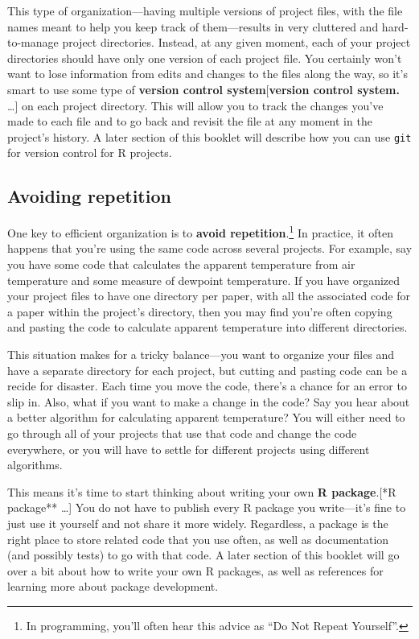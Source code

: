\documentclass[]{tufte-book}
\begin{document}
This type of organization---having multiple versions of project files, with the file names
meant to help you keep track of them---results in very cluttered and hard-to-manage project
directories. Instead, at any given moment, each of your project directories should have only
one version of each project file. You certainly won't want to lose information from edits
and changes to the files along the way, so it's smart to use some type of \textbf{version control
system}{[}\textbf{version control system.} \ldots{}{]} on each project directory. This will allow you
to track the changes you've made to each file and to go back and revisit the file at any
moment in the project's history. A later section of this booklet will describe how you can
use \texttt{git} for version control for R projects.

\hypertarget{avoiding-repetition}{%
\subsection{Avoiding repetition}\label{avoiding-repetition}}

One key to efficient organization is to \textbf{avoid repetition}.\footnote{In programming, you'll often
  hear this advice as ``Do Not Repeat Yourself''.} In practice, it often happens that you're using the
same code across several projects. For example, say you have some code that calculates the
apparent temperature from air temperature and some measure of dewpoint temperature. If you have
organized your project files to have one directory per paper, with all the associated code for
a paper within the project's directory, then you may find you're often copying and pasting the
code to calculate apparent temperature into different directories.

This situation makes for a tricky balance---you want to organize your files and have a separate
directory for each project, but cutting and pasting code can be a recide for disaster. Each time
you move the code, there's a chance for an error to slip in. Also, what if you want to make a change
in the code? Say you hear about a better algorithm for calculating apparent temperature?
You will either need to go through all of your projects that use that code and change the code
everywhere, or you will have to settle for different projects using different algorithms.

This means it's time to start thinking about writing your own \textbf{R package}.{[}\citet{*}*R package** \ldots{}{]}
You do not have to publish every R package you write---it's fine to just use it yourself and not
share it more widely. Regardless, a package is the right place to store related code that you use
often, as well as documentation (and possibly tests) to go with that code. A later section of this
booklet will go over a bit about how to write your own R packages, as well as references for
learning more about package development.
\end{document}
